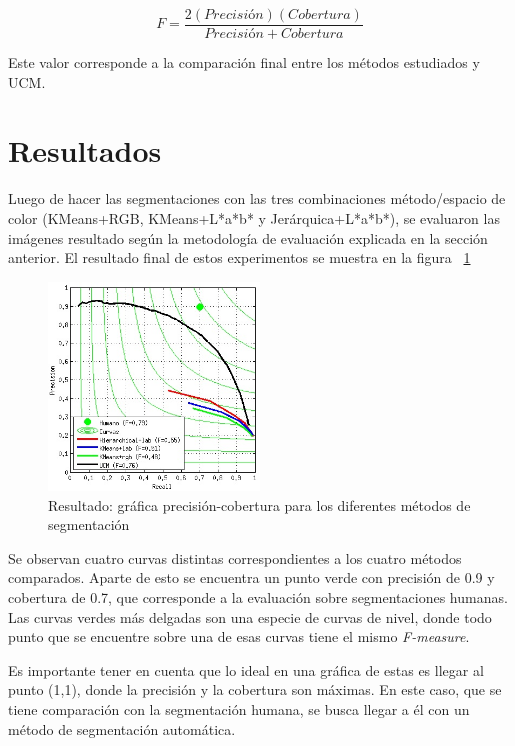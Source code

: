 \documentclass[10pt,twocolumn,letterpaper]{article}
\begin{document}
\begin{equation}
 F=\frac{2(Precisión)(Cobertura)}{Precisión+Cobertura}
\end{equation}

Este valor corresponde a la comparación final entre los métodos estudiados y UCM.

\section{Resultados}
Luego de hacer las segmentaciones con las tres combinaciones método/espacio de color (KMeans+RGB, KMeans+L*a*b* y Jerárquica+L*a*b*), se evaluaron las imágenes resultado según la metodología de evaluación explicada en la sección anterior. El resultado final de estos experimentos se muestra en la figura ~\ref{fig:resultados}

\begin{figure}[h]
    \centering
    \includegraphics[width=0.5\textwidth]{PrecisionRecallComparativo.jpg}
    \caption{Resultado: gráfica precisión-cobertura para los diferentes métodos de segmentación}
    \label{fig:resultados}
\end{figure}

Se observan cuatro curvas distintas correspondientes a los cuatro métodos comparados. Aparte de esto se encuentra un punto verde con precisión de 0.9 y cobertura de 0.7, que corresponde a la evaluación sobre segmentaciones humanas. Las curvas verdes más delgadas son una especie de curvas de nivel, donde todo punto que se encuentre sobre una de esas curvas tiene el mismo \textit{F-measure}.

Es importante tener en cuenta que lo ideal en una gráfica de estas es llegar al punto (1,1), donde la precisión y la cobertura son máximas. En este caso, que se tiene comparación con la segmentación humana, se busca llegar a él con un método de segmentación automática.
\end{document}
